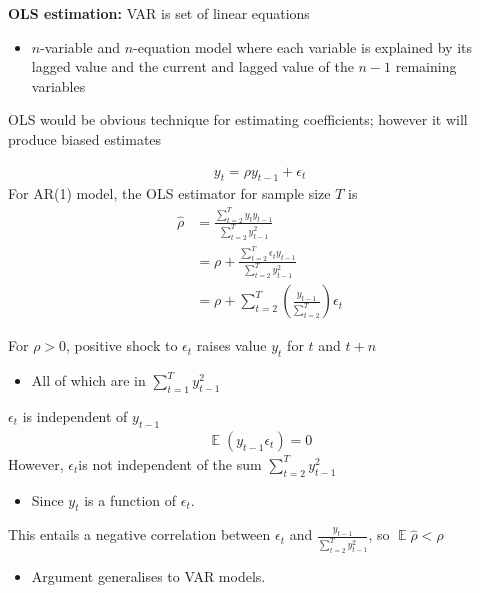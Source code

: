 \documentclass{beamer}
\begin{document}
\begin{frame}
  \textbf{OLS estimation:} VAR is set of linear equations
  \begin{itemize}
    \item $n$-variable and $n$-equation model where each variable is explained by its lagged value and the current and lagged value of the $n-1$ remaining variables
  \end{itemize}
  \medskip
  OLS would be obvious technique for estimating coefficients; however it will produce biased estimates
\end{frame}

\begin{frame}  
\begin{align}
  y_t= \rho y_{t-1} + \epsilon_t
\end{align}
 For AR(1) model, the OLS estimator for sample size $T$ is
\begin{align}
  \hat{\rho} &= \frac{\sum^T_{t=2}y_t y_{t-1}}{\sum^T_{t=2}y^2_{t-1}}\\ \nonumber
  &= \rho + \frac{\sum^T_{t=2}\epsilon_t y_{t-1}}{\sum^T_{t=2}y^2_{t-1}}\\ \nonumber
  &= \rho + \sum_{t=2}^T \left(\frac{y_{t-1}}{\sum_{t=2}^T} \right) \epsilon_t
\end{align}
\end{frame}

\begin{frame}
 For $\rho>0$, positive shock to $\epsilon_t$ raises value $y_t$ for $t$ and $t+n$
 \begin{itemize}
   \item All of which are in $\sum^T_{t=1}y^2_{t-1}$
 \end{itemize}
 $\epsilon_t$ is independent of $y_{t-1}$ 
 \begin{align}
    \mathop{\mathbb{E}}(y_{t-1}\epsilon_t)= 0  
 \end{align}
 \medskip
 However, $\epsilon_t$is not independent of the sum  $\sum^T_{t=2}y^2_{t-1}$
 \begin{itemize}
   \item Since $y_t$ is a function of $\epsilon_t$.
 \end{itemize}
This entails a negative correlation between $\epsilon_t$ and $\frac{y_{t-1}}{\sum^T_{t=2}y^2_{t-1}}$, so $\mathop{\mathbb{E}} \hat{\rho}<\rho$
\begin{itemize}
  \item Argument generalises to VAR models.
\end{itemize}
\end{frame}
\end{document}
